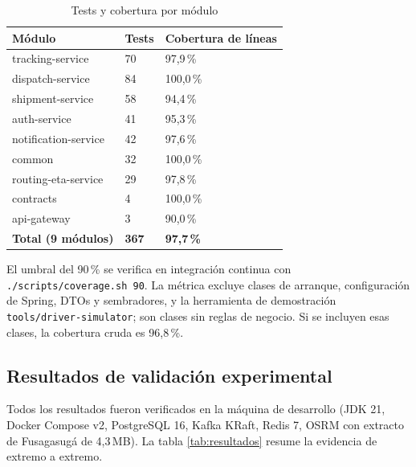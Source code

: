 \documentclass[conference]{IEEEtran}
\newcommand{\pkg}[1]{\texttt{#1}}
\begin{document}
\begin{table}[t]
\centering
\caption{Tests y cobertura por módulo}
\small
\begin{tabular}{@{}L{4.6cm}C{2cm}C{2.6cm}@{}}
\toprule
\textbf{Módulo} & \textbf{Tests} & \textbf{Cobertura de líneas}\\
\midrule
tracking-service & 70 & 97,9\,\%\\
dispatch-service & 84 & 100,0\,\%\\
shipment-service & 58 & 94,4\,\%\\
auth-service & 41 & 95,3\,\%\\
notification-service & 42 & 97,6\,\%\\
common & 32 & 100,0\,\%\\
routing-eta-service & 29 & 97,8\,\%\\
contracts & 4 & 100,0\,\%\\
api-gateway & 3 & 90,0\,\%\\
\midrule
\textbf{Total (9 m\'odulos)} & \textbf{367} & \textbf{97,7\,\%}\\
\bottomrule
\end{tabular}
\end{table}

El umbral del 90\,\% se verifica en integraci\'on continua con \pkg{./scripts/coverage.sh 90}.
La m\'etrica excluye clases de arranque, configuraci\'on de Spring, DTOs y sembradores, y la
herramienta de demostraci\'on \pkg{tools/driver-simulator}; son clases sin reglas de negocio. Si se
incluyen esas clases, la cobertura cruda es 96,8\,\%.

\subsection{Resultados de validaci\'on experimental}
\label{sec:resultados}

Todos los resultados fueron verificados en la m\'aquina de desarrollo (JDK 21, Docker Compose v2,
PostgreSQL 16, Kafka KRaft, Redis 7, OSRM con extracto de Fusagasug\'a de 4,3\,MB). La tabla
\ref{tab:resultados} resume la evidencia de extremo a extremo.
\end{document}
